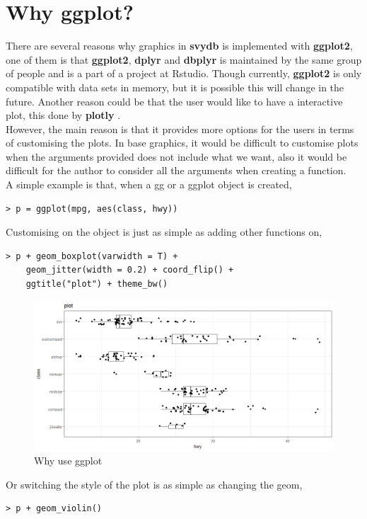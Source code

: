 \newpage
\section{Why ggplot?} \label{c3.5}

There are several reasons why  graphics in {\bf svydb} is implemented with {\bf ggplot2}, one of them is that {\bf ggplot2}, {\bf dplyr} and {\bf dbplyr} is maintained by the same group of people and is a part of a project at Rstudio. Though currently, {\bf ggplot2} is only compatible with data sets in memory, but it is possible this will change in the future. Another reason could be that the user would like to have a interactive plot, this done by {\bf plotly} \citep{plotlypackage}. \\

However, the main reason is that it provides more options for the users in terms of customising the plots. 
In base graphics, it would be difficult to customise plots when the arguments provided does not include what we want, also it would be difficult for the author to consider all the arguments when creating a function.\\

A simple example is that, when a {\ttfamily gg} or a {\ttfamily ggplot} object is created,
\begin{lstlisting}
> p = ggplot(mpg, aes(class, hwy))
\end{lstlisting}
Customising on the object is just as simple as adding other functions on,
\begin{lstlisting}
> p + geom_boxplot(varwidth = T) + 
    geom_jitter(width = 0.2) + coord_flip() + 
    ggtitle("plot") + theme_bw()
\end{lstlisting}

\begin{figure}[h]
    \centering
    \includegraphics[scale = 0.55]{img/whygg1.jpeg}
    \caption{Why use {\ttfamily ggplot}}
\end{figure}

Or switching the style of the plot is as simple as changing the {\ttfamily geom},
\begin{lstlisting}
> p + geom_violin()
\end{lstlisting}

